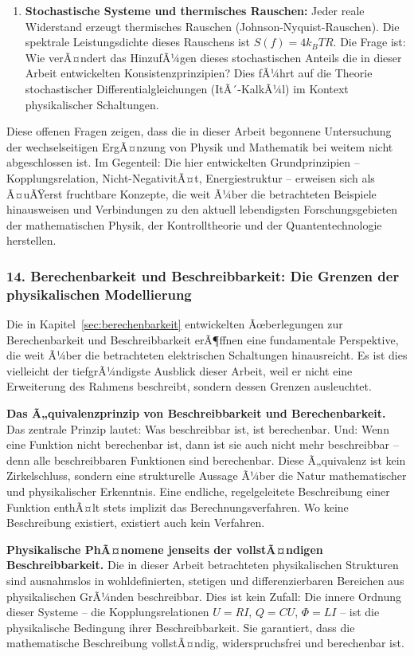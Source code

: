 ﻿\documentclass[12pt, a4paper]{article}
\begin{document}
\begin{enumerate}
		\item \textbf{Stochastische Systeme und thermisches Rauschen:} Jeder reale Widerstand erzeugt thermisches Rauschen (Johnson-Nyquist-Rauschen). Die spektrale Leistungsdichte dieses Rauschens ist $S(f) = 4k_BT R$. Die Frage ist: Wie verÃ¤ndert das HinzufÃ¼gen dieses stochastischen Anteils die in dieser Arbeit entwickelten Konsistenzprinzipien? Dies fÃ¼hrt auf die Theorie stochastischer Differentialgleichungen (ItÃ´-KalkÃ¼l) im Kontext physikalischer Schaltungen.
	\end{enumerate}

	Diese offenen Fragen zeigen, dass die in dieser Arbeit begonnene Untersuchung der wechselseitigen ErgÃ¤nzung von Physik und Mathematik bei weitem nicht abgeschlossen ist. Im Gegenteil: Die hier entwickelten Grundprinzipien -- Kopplungsrelation, Nicht-NegativitÃ¤t, Energiestruktur -- erweisen sich als Ã¤uÃŸerst fruchtbare Konzepte, die weit Ã¼ber die betrachteten Beispiele hinausweisen und Verbindungen zu den aktuell lebendigsten Forschungsgebieten der mathematischen Physik, der Kontrolltheorie und der Quantentechnologie herstellen.

	\subsubsection*{14. \quad Berechenbarkeit und Beschreibbarkeit: Die Grenzen der physikalischen Modellierung}

	Die in Kapitel~\ref{sec:berechenbarkeit} entwickelten Ãœberlegungen zur Berechenbarkeit und Beschreibbarkeit erÃ¶ffnen eine fundamentale Perspektive, die weit Ã¼ber die betrachteten elektrischen Schaltungen hinausreicht. Es ist dies vielleicht der tiefgrÃ¼ndigste Ausblick dieser Arbeit, weil er nicht eine Erweiterung des Rahmens beschreibt, sondern dessen Grenzen ausleuchtet.

	\textbf{Das Ã„quivalenzprinzip von Beschreibbarkeit und Berechenbarkeit.}
	Das zentrale Prinzip lautet: Was beschreibbar ist, ist berechenbar. Und: Wenn eine Funktion nicht berechenbar ist, dann ist sie auch nicht mehr beschreibbar -- denn alle beschreibbaren Funktionen sind berechenbar. Diese Ã„quivalenz ist kein Zirkelschluss, sondern eine strukturelle Aussage Ã¼ber die Natur mathematischer und physikalischer Erkenntnis. Eine endliche, regelgeleitete Beschreibung einer Funktion enthÃ¤lt stets implizit das Berechnungsverfahren. Wo keine Beschreibung existiert, existiert auch kein Verfahren.

	\textbf{Physikalische PhÃ¤nomene jenseits der vollstÃ¤ndigen Beschreibbarkeit.}
	Die in dieser Arbeit betrachteten physikalischen Strukturen sind ausnahmslos in wohldefinierten, stetigen und differenzierbaren Bereichen aus physikalischen GrÃ¼nden beschreibbar. Dies ist kein Zufall: Die innere Ordnung dieser Systeme -- die Kopplungsrelationen $U = RI$, $Q = CU$, $\Phi = LI$ -- ist die physikalische Bedingung ihrer Beschreibbarkeit. Sie garantiert, dass die mathematische Beschreibung vollstÃ¤ndig, widerspruchsfrei und berechenbar ist.
\end{document}
